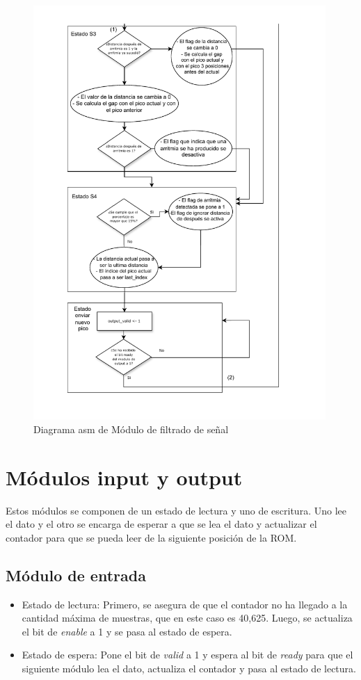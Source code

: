 \begin{figure}[h!]
    \centering
    \includegraphics[width=0.99\textwidth]{./Images/img_implementacion_hw/Diagramaasmarritmias2.pdf}
    \caption{Diagrama asm de Módulo de filtrado de señal}
    \label{fig:Diagramaasmarritmias2}
\end{figure} 
\FloatBarrier
\section{Módulos input y output}
Estos módulos se componen de un estado de lectura y uno de escritura. Uno lee el dato y el otro se encarga de esperar a que se lea el dato y actualizar el contador para que se pueda leer de la siguiente posición de la ROM.

\subsection{Módulo de entrada}
\begin{itemize}
\item Estado de lectura: Primero, se asegura de que el contador no ha llegado a la cantidad máxima de muestras, que en este caso es 40,625. Luego, se actualiza el bit de \textit{enable} a 1 y se pasa al estado de espera.
\item Estado de espera: Pone el bit de \textit{valid} a 1 y espera al bit de \textit{ready} para que el siguiente módulo lea el dato, actualiza el contador y pasa al estado de lectura.
\end{itemize}

